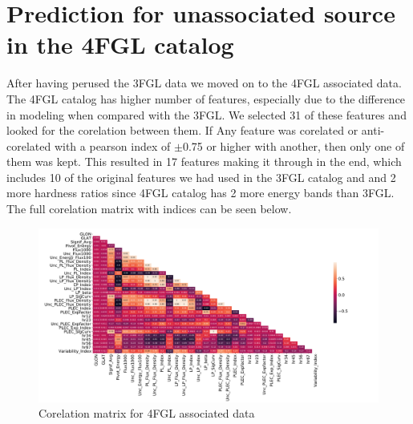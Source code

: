 \section{Prediction for unassociated source in the 4FGL catalog}

After having perused the 3FGL data we moved on to the 4FGL associated data. The 4FGL catalog has higher number of features, especially due to the difference in modeling when compared with the 3FGL. We selected 31 of these features and looked for the corelation between them. If Any feature was corelated or anti-corelated with a pearson index of $\pm$0.75 or higher with another, then only one of them was kept. This resulted in 17 features making it through in the end, which includes 10 of the original features we had used in the 3FGL catalog and and 2 more hardness ratios since 4FGL catalog has 2 more energy bands than 3FGL. The full corelation matrix with indices can be seen below.\\

\begin{figure}[h]
\centering
\includegraphics[width=\textwidth]{plots/correlation_4fgl_assoc.pdf}
\caption{Corelation matrix for 4FGL associated data }
\label{fig:corr_mat}
\end{figure}


